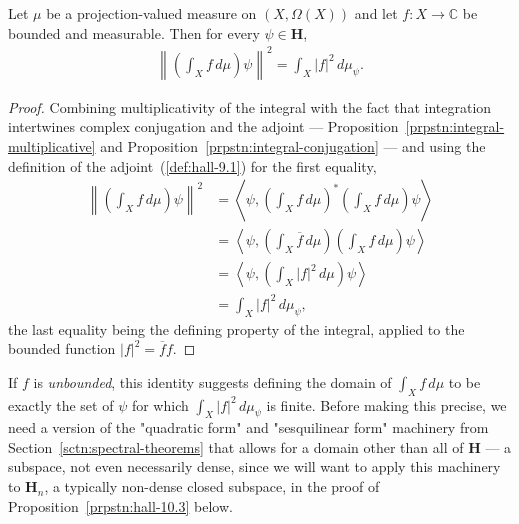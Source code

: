\begin{lemma}
    \label{lmm:norm-identity-bounded-integral}
    \leanok
    Let $\mu$ be a projection-valued measure on $(X,\Omega(X))$ and let $f : X \to \mathbb{C}$ be bounded and measurable. Then for every $\psi \in \mathbf{H}$,
    \begin{align}
        \left\| \left( \int_X f \, d\mu \right) \psi \right\|^2 = \int_X \lvert f \rvert^2 \, d\mu_\psi.
    \end{align}
\end{lemma}
\begin{proof}
    \leanok
Combining multiplicativity of the integral with the fact that integration intertwines complex conjugation and the adjoint — Proposition~\ref{prpstn:integral-multiplicative} and Proposition~\ref{prpstn:integral-conjugation} — and using the definition of the adjoint~(\ref{def:hall-9.1}) for the first equality,
\begin{align}
    \left\| \left( \int_X f \, d\mu \right) \psi \right\|^2 &= \left< \psi, \left( \int_X f \, d\mu \right)^* \left( \int_X f \, d\mu \right) \psi \right> \\
                                                             &= \left< \psi, \left( \int_X \overline{f} \, d\mu \right)\left( \int_X f \, d\mu \right) \psi \right> \\
                                                             &= \left< \psi, \left( \int_X \lvert f \rvert^2 \, d\mu \right) \psi \right> \\
                                                             &= \int_X \lvert f \rvert^2 \, d\mu_\psi,
\end{align}
the last equality being the defining property of the integral, applied to the bounded function $\lvert f \rvert^2 = \overline{f}f$.
\end{proof}

If $f$ is \textit{unbounded}, this identity suggests defining the domain of $\int_X f \, d\mu$ to be exactly the set of $\psi$ for which $\int_X \lvert f \rvert^2 \, d\mu_\psi$ is finite. Before making this precise, we need a version of the "quadratic form" and "sesquilinear form" machinery from Section~\ref{sctn:spectral-theorems} that allows for a domain other than all of $\mathbf{H}$ — a subspace, not even necessarily dense, since we will want to apply this machinery to $\mathbf{H}_n$, a typically non-dense closed subspace, in the proof of Proposition~\ref{prpstn:hall-10.3} below.

